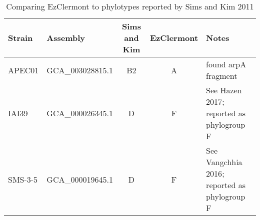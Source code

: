 \begin{table}[h]
\centering
\caption{Comparing EzClermont to phylotypes reported by Sims and Kim 2011\cite{Sims2011}}
\label{tab:sims}
\begin{tabular}{llccl}
  Strain  & Assembly         & Sims and Kim & EzClermont & Notes                                        \\
  \hline
APEC01  & GCA\_003028815.1 & B2           & A          & found arpA fragment                          \\
IAI39   & GCA\_000026345.1 & D            & F          & See Hazen 2017\cite{Hazen2017}; reported as phylogroup F     \\
SMS-3-5 & GCA\_000019645.1 & D            & F          & See Vangchhia 2016\cite{Vangchhia2016}; reported as phylogroup F
\end{tabular}
\end{table}